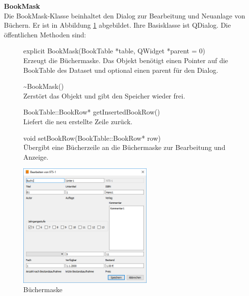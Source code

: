 \textbf{BookMask}\\
Die BookMask-Klasse beinhaltet den Dialog zur Bearbeitung und Neuanlage von Büchern. Er ist in Abbildung \ref{fig:BookMask} abgebildet. Ihre Basisklasse ist QDialog. Die öffentlichen Methoden sind:
\begin{description}
	\item[ ] explicit BookMask(BookTable *table, QWidget *parent = 0)\\
	Erzeugt die Büchermaske. Das Objekt benötigt einen Pointer auf die BookTable des Dataset und optional einen parent für den Dialog.
  \item[ ] \~{}BookMask()\\
	Zerstört das Objekt und gibt den Speicher wieder frei.	
  \item[ ] BookTable::BookRow* getInsertedBookRow()\\
	Liefert die neu erstellte Zeile zurück.
  \item[ ] void setBookRow(BookTable::BookRow* row)\\
	Übergibt eine Bücherzeile an die Büchermaske zur Bearbeitung und Anzeige.
\end{description}
\begin{figure}[htb]
	\centering
		\includegraphics[width=0.60\textwidth]{figures/BookMask.png}
	\caption{Büchermaske}
	\label{fig:BookMask}
\end{figure}

